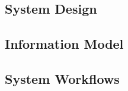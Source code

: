 \clearpage

\subsection{System Design}\label{sec:proposal:system_design}



\clearpage

\subsection{Information Model}



\clearpage


\subsection{System Workflows}\label{sec:workflows}


